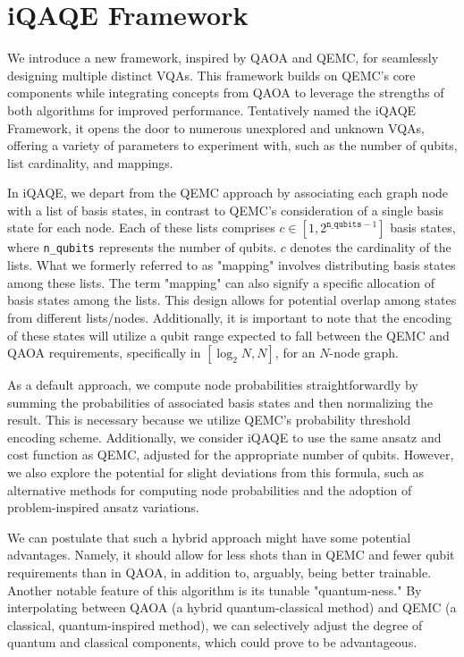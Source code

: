 \section{iQAQE Framework}
\label{sec: Methodology}
We introduce a new framework, inspired by QAOA and QEMC, for seamlessly designing multiple distinct VQAs. This framework builds on QEMC's core components while integrating concepts from QAOA to leverage the strengths of both algorithms for improved performance. Tentatively named the iQAQE Framework, it opens the door to numerous unexplored and unknown VQAs, offering a variety of parameters to experiment with, such as the number of qubits, list cardinality, and mappings.

In iQAQE, we depart from the QEMC approach by associating each graph node with a list of basis states, in contrast to QEMC's consideration of a single basis state for each node. Each of these lists comprises $c \in \left[1, 2^{\texttt{n\_qubits}-1}\right]$ basis states, where \texttt{n\_qubits} represents the number of qubits. $c$ denotes the cardinality of the lists. What we formerly referred to as "mapping" involves distributing basis states among these lists. The term "mapping" can also signify a specific allocation of basis states among the lists. This design allows for potential overlap among states from different lists/nodes. Additionally, it is important to note that the encoding of these states will utilize a qubit range expected to fall between the QEMC and QAOA requirements, specifically in $[\log_2{N}, N]$, for an $N$-node graph.

As a default approach, we compute node probabilities straightforwardly by summing the probabilities of associated basis states and then normalizing the result. This is necessary because we utilize QEMC's probability threshold encoding scheme. Additionally, we consider iQAQE to use the same ansatz and cost function as QEMC, adjusted for the appropriate number of qubits. However, we also explore the potential for slight deviations from this formula, such as alternative methods for computing node probabilities and the adoption of problem-inspired ansatz variations.

We can postulate that such a hybrid approach might have some potential advantages. Namely, it should allow for less shots than in QEMC and fewer qubit requirements than in QAOA, in addition to, arguably, being better trainable. Another notable feature of this algorithm is its tunable "quantum-ness." By interpolating between QAOA (a hybrid quantum-classical method) and QEMC (a classical, quantum-inspired method), we can selectively adjust the degree of quantum and classical components, which could prove to be advantageous.

